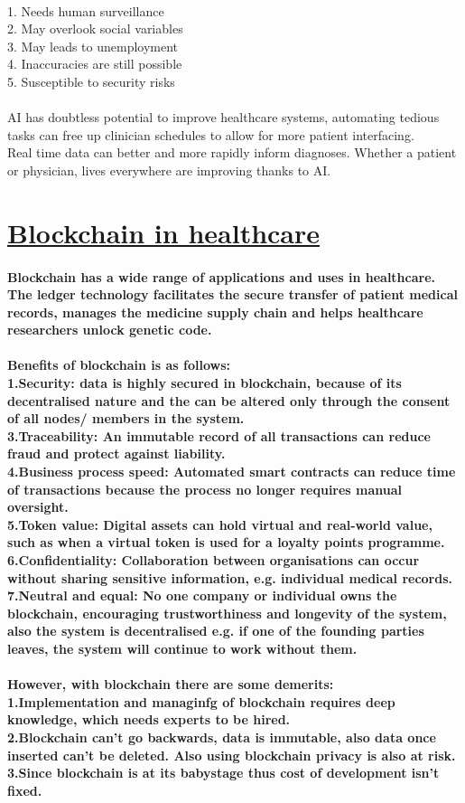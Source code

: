 \documentclass[12pt]{article}
\begin{document}
{    \\ 1.  Needs human surveillance
    \\ 2.  May overlook social variables
    \\ 3.  May leads to unemployment
    \\ 4.  Inaccuracies are still possible
    \\ 5.  Susceptible to security risks
    \\\\AI has doubtless potential to improve healthcare systems, automating tedious tasks can free up clinician schedules to allow for more patient interfacing.
    \\ Real time data can better and more rapidly inform diagnoses. Whether a patient or physician, lives everywhere are improving thanks to AI.}
	\section{\underline{Blockchain in healthcare}}
	\paragraph{Blockchain has a wide range of applications and uses in healthcare. The ledger technology facilitates the secure transfer of patient medical records, manages the medicine supply chain and helps healthcare researchers unlock genetic code.
    \\\\Benefits of blockchain is as follows:
    \\ 1.Security: data is highly secured in blockchain, because of its decentralised nature and the can be altered only through the consent of all nodes/ members in the system.
    \\ 3.Traceability: An immutable record of all transactions can reduce fraud and protect against liability.
    \\ 4.Business process speed: Automated smart contracts can reduce time of transactions because the process no longer requires manual oversight.
    \\ 5.Token value: Digital assets can hold virtual and real-world value, such as when a virtual token is used for a loyalty points programme.
    \\ 6.Confidentiality: Collaboration between organisations can occur without sharing sensitive information, e.g. individual medical records.
    \\ 7.Neutral and equal: No one company or individual owns the blockchain, encouraging trustworthiness and longevity of the system, also the system is decentralised e.g. if one of the founding parties leaves, the system will continue to work without them.
    \\\\However, with blockchain there are some demerits:
    \\ 1.Implementation and managinfg of blockchain requires deep knowledge, which needs experts to be hired.
    \\ 2.Blockchain can't go backwards, data is immutable, also data once inserted can't be deleted. Also using blockchain privacy is also at risk.
    \\ 3.Since blockchain is at its babystage thus cost of development isn't fixed.}
\end{document}
